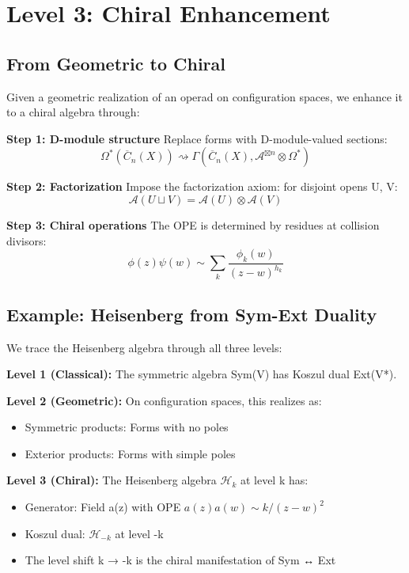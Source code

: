 \section{Level 3: Chiral Enhancement}

\subsection{From Geometric to Chiral}

\begin{construction}\label{const:chiral-enhancement}
Given a geometric realization of an operad on configuration spaces, we enhance it to a chiral algebra through:

\textbf{Step 1: D-module structure}
Replace forms with D-module-valued sections:
$$\Omega^*(\overline{C}_n(X)) \rightsquigarrow \Gamma(\overline{C}_n(X), \mathcal{A}^{\boxtimes n} \otimes \Omega^*)$$

\textbf{Step 2: Factorization}
Impose the factorization axiom: for disjoint opens U, V:
$$\mathcal{A}(U \sqcup V) = \mathcal{A}(U) \otimes \mathcal{A}(V)$$

\textbf{Step 3: Chiral operations}
The OPE is determined by residues at collision divisors:
$$\phi(z) \psi(w) \sim \sum_k \frac{\phi_k(w)}{(z-w)^{h_k}}$$
\end{construction}

\subsection{Example: Heisenberg from Sym-Ext Duality}

\begin{example}\label{ex:heisenberg-enhancement}
We trace the Heisenberg algebra through all three levels:

\textbf{Level 1 (Classical):}
The symmetric algebra Sym(V) has Koszul dual Ext(V*).

\textbf{Level 2 (Geometric):}
On configuration spaces, this realizes as:
\begin{itemize}
\item Symmetric products: Forms with no poles
\item Exterior products: Forms with simple poles
\end{itemize}

\textbf{Level 3 (Chiral):}
The Heisenberg algebra $\mathcal{H}_k$ at level k has:
\begin{itemize}
\item Generator: Field a(z) with OPE $a(z)a(w) \sim k/(z-w)^2$
\item Koszul dual: $\mathcal{H}_{-k}$ at level -k
\item The level shift k → -k is the chiral manifestation of Sym ↔ Ext
\end{itemize}
\end{example}

